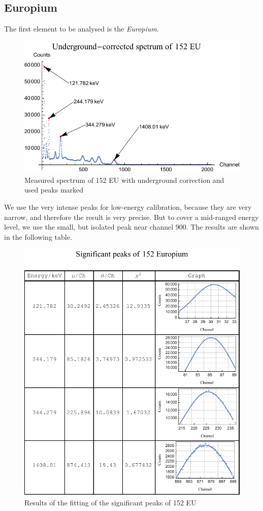 \documentclass[10pt,a4paper]{article}
\begin{document}
\subsection*{Europium}
The first element to be analysed is the \textit{Europium}. 
\begin{figure}[hbtp]
\centering
\includegraphics[scale=1.1]{EuropiumLin.pdf}
\caption{Measured spectrum of 152 EU with underground correction and used peaks marked}
\end{figure}
\newline
We use the very intense peaks for low-energy calibration, because they are very narrow, and therefore the result is very precise. But to cover a mid-ranged energy level, we use the small, but isolated peak near channel 900. The results are shown in the following table.
\begin{figure}[hbtp]
\centering
\includegraphics[scale=1.3]{EuropoiumTable.pdf}
\caption{Results of the fitting of the significant peaks of 152 EU }
\end{figure}
\end{document}
